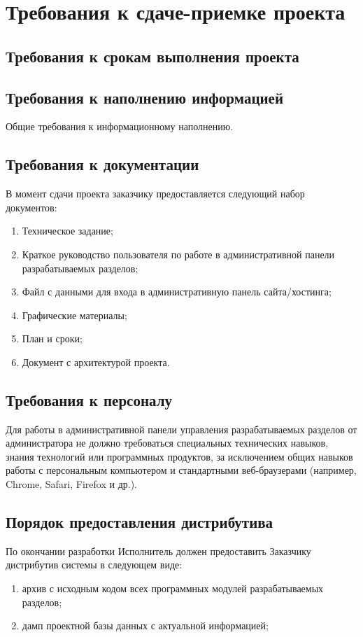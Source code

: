 \section{Требования к сдаче-приемке проекта}
\subsection{Требования к срокам выполнения проекта}

\subsection{Требования к наполнению информацией}
Общие требования к информационному наполнению.

\subsection{Требования к документации}
В момент сдачи проекта заказчику предоставляется следующий набор документов:
\begin{enumerate}
	\item Техническое задание;
	\item Краткое руководство пользователя по работе в административной панели разрабатываемых разделов;
	\item Файл с данными для входа в административную панель сайта/хостинга;
	\item Графические материалы;
	\item План и сроки;
	\item Документ с архитектурой проекта.
\end{enumerate}

\subsection{Требования к персоналу}
Для работы в административной панели управления разрабатываемых разделов от администратора не должно требоваться специальных технических навыков, знания технологий или программных продуктов, за исключением общих навыков работы с персональным компьютером и стандартными веб-браузерами (например, Chrome, Safari, Firefox и др.).

\subsection{Порядок предоставления дистрибутива}
По окончании разработки Исполнитель должен предоставить Заказчику дистрибутив системы в следующем виде:
\begin{enumerate}
	\item архив с исходным кодом всех программных модулей разрабатываемых разделов;
	\item дамп проектной базы данных с актуальной информацией;
\end{enumerate}

